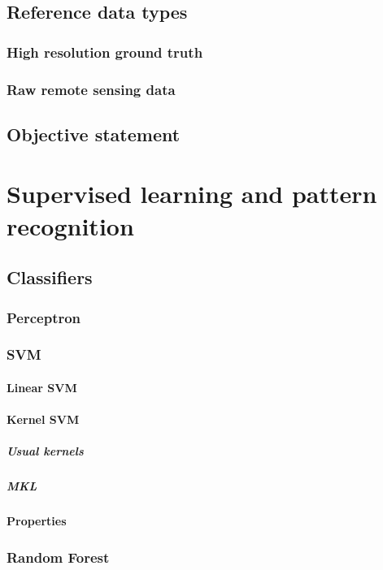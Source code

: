     \subsection{Reference data types}
        \label{subsec::state_of_the_art::quality::reference}

        \subsubsection{High resolution ground truth}

        \subsubsection{Raw remote sensing data}

    \subsection{Objective statement}
\section{Supervised learning and pattern recognition}
    \subsection{Classifiers}
        \subsubsection{Perceptron}
        \subsubsection{SVM}
            \paragraph{Linear SVM}
            \paragraph{Kernel SVM}
                \subparagraph{Usual kernels}
                \subparagraph{MKL}
            \paragraph{Properties}
        \subsubsection{Random Forest}
